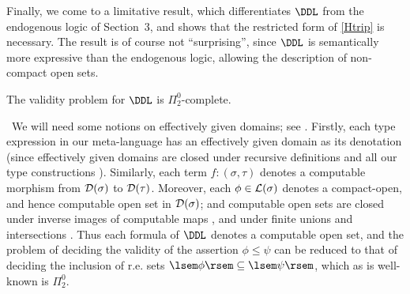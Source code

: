 Finally, we come to a limitative result, which differentiates $\DDL$ from the
endogenous logic of Section~3, and shows that the restricted form of \ref{Htrip} is necessary.
The result is of course not ``surprising'', since 
$\DDL$ is semantically more expressive than the endogenous logic,  allowing
the description of non-compact open sets.
\begin{theorem}
The validity problem for $\DDL$ is $\Pi^{0}_{2}$-complete.
\end{theorem}

\proof\ 
We will need some notions on effectively given domains; see \cite[Chapter 7]{PloLN}.
Firstly, each type expression in our meta-language has an effectively given 
domain as its denotation (since effectively given domains are closed under recursive definitions and all our type constructions \cite[Chapter 7 pp.\ 16, 21, Chapter 8 pp.\ 16, 54]{PloLN}).
Similarly, each term $f : (\sigma , \tau )$ denotes a computable morphism from
${\cal D}(\sigma )$ to ${\cal D}(\tau )$.
Moreover, each $\phi \in {\cal L}(\sigma )$ denotes a compact-open, and hence
computable open set in ${\cal D}(\sigma )$; and computable open sets are closed
under inverse images of computable maps \cite[Chapter 7 p.\ 9]{PloLN},
and under finite unions and intersections \cite[Chapter 7 p.\ 7]{PloLN}.
Thus each formula of $\DDL$ denotes a computable open set, and the problem
of deciding the validity of the assertion $\phi \leq \psi$ can be reduced
to that of deciding the inclusion of r.e. sets $\lsem \phi \rsem \subseteq \lsem \psi \rsem$, which as is well-known \cite[IV.1.6]{Soa87} is  $\Pi^{0}_{2}$.


